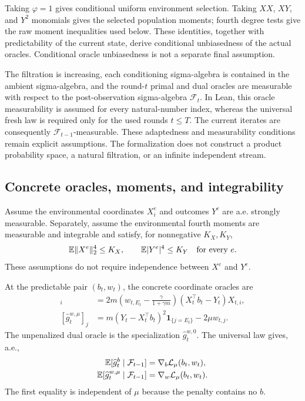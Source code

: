 Taking $\varphi=1$ gives conditional uniform environment selection.  Taking
$XX$, $XY$, and $Y^2$ monomials gives the selected population moments; fourth
degree tests give the raw moment inequalities used below.  These identities,
together with predictability of the current state, derive conditional
unbiasedness of the actual oracles.  Conditional oracle unbiasedness is not a
separate final assumption.

The filtration is increasing, each conditioning sigma-algebra is contained in
the ambient sigma-algebra, and the round-$t$ primal and dual oracles are
measurable with respect to the post-observation sigma-algebra $\mathcal F_t$.
In Lean, this oracle measurability is assumed for every natural-number index,
whereas the universal fresh law is required only for the used rounds $t\le T$.
The current iterates are consequently $\mathcal F_{t-1}$-measurable.  These
adaptedness and measurability conditions remain explicit assumptions.  The
formalization does not construct a product probability space, a natural
filtration, or an infinite independent stream.

\subsection{Concrete oracles, moments, and integrability}

Assume the environmental coordinates $X_i^e$ and outcomes $Y^e$ are a.e.
strongly measurable.  Separately, assume the environmental fourth moments are
measurable and integrable and
satisfy, for nonnegative $K_X,K_Y$,
\begin{equation}
  \mathbb{E}\|X^e\|_2^4\le K_X,
  \qquad
  \mathbb{E}|Y^e|^4\le K_Y
  \quad\text{for every }e.
  \label{eq:data-fourth-moments}
\end{equation}
These assumptions do not require independence between $X^e$ and $Y^e$.

At the predictable pair $(b_t,w_t)$, the concrete coordinate oracles are
\begin{align}
  [\widehat g_t^b]_i
  &=2m\left(w_{t,E_t}-\frac{\gamma}{1+\gamma m}\right)
       (X_t^\top b_t-Y_t)X_{t,i},
  \label{eq:online-primal-gradient}\\
  [\widehat g_t^{w,\mu}]_j
  &=m(Y_t-X_t^\top b_t)^2\mathbf 1_{\{j=E_t\}}-2\mu w_{t,j}.
  \label{eq:online-stochastic-gradients}
\end{align}
The unpenalized dual oracle is the specialization
$\widehat g_t^{w,0}$.  The universal law gives, a.e.,
\begin{align}
  \mathbb{E}[\widehat g_t^b\mid\mathcal F_{t-1}]
  &=\nabla_b\mathcal L_\mu(b_t,w_t),\\
  \mathbb{E}[\widehat g_t^{w,\mu}\mid\mathcal F_{t-1}]
  &=\nabla_w\mathcal L_\mu(b_t,w_t).
  \label{eq:online-unbiasedness}
\end{align}
The first equality is independent of $\mu$ because the penalty contains no
$b$.

